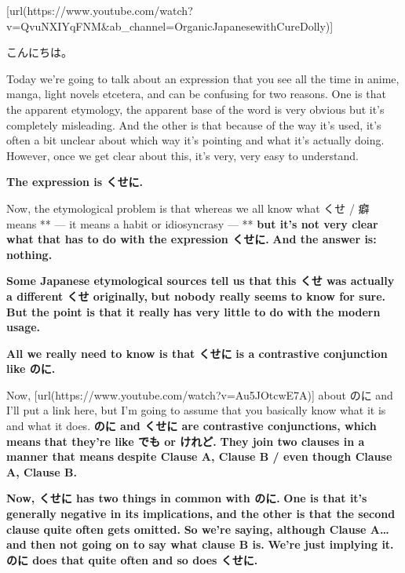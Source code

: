 \startsectionlevel[title={{\bf 93. Cussin' 'Em Out with くせに. How it works.}},reference={cussin-em-out-with-くせに.-how-it-works.}]

[url(https://www.youtube.com/watch?v=QvuNXIYqFNM&ab_channel=OrganicJapanesewithCureDolly)]

こんにちは。

Today we're going to talk about an expression that you see all the time in anime, manga, light novels etcetera, and can be confusing for two reasons. One is that the apparent etymology, the apparent base of the word is very obvious but it's completely misleading. And the other is that because of the way it's used, it's often a bit unclear about which way it's pointing and what it's actually doing. However, once we get clear about this, it's very, very easy to understand.

{\bf The expression is くせに.}

{}

Now, the etymological problem is that whereas we all know what くせ / 癖 means ** --- it means a habit or idiosyncrasy --- ** {\bf but it's not very clear what that has to do with the expression くせに.} {\bf And the answer is: nothing.}

{\bf Some Japanese etymological sources tell us that} {\bf this くせ was actually a different くせ originally,} {\bf but nobody really seems to know for sure.} {\bf But the point is that it really} {\bf has very little to do with the modern usage.}

\thinrule

{\bf All we really need to know is that くせに} {\bf is a contrastive conjunction like のに.}

{}

Now, [url(https://www.youtube.com/watch?v=Au5JOtcwE7A)] about のに and I'll put a link here, but I'm going to assume that you basically know what it is and what it does. {\bf のに and くせに are contrastive conjunctions, which means} {\bf that they're like でも or けれど.} {\bf They join two clauses in a manner that means} {\bf despite Clause A, Clause B / even though Clause A, Clause B.}

\thinrule

{\bf Now, くせに has two things in common with のに.} {\bf One is that it's generally negative in its implications,} {\bf and the other is that the second clause quite often gets omitted.} {\bf So we're saying, although Clause A\ldots{}} {\bf and then not going on to say what clause B is.} {\bf We're just implying it.} {\bf のに does that quite often and so does くせに.}

